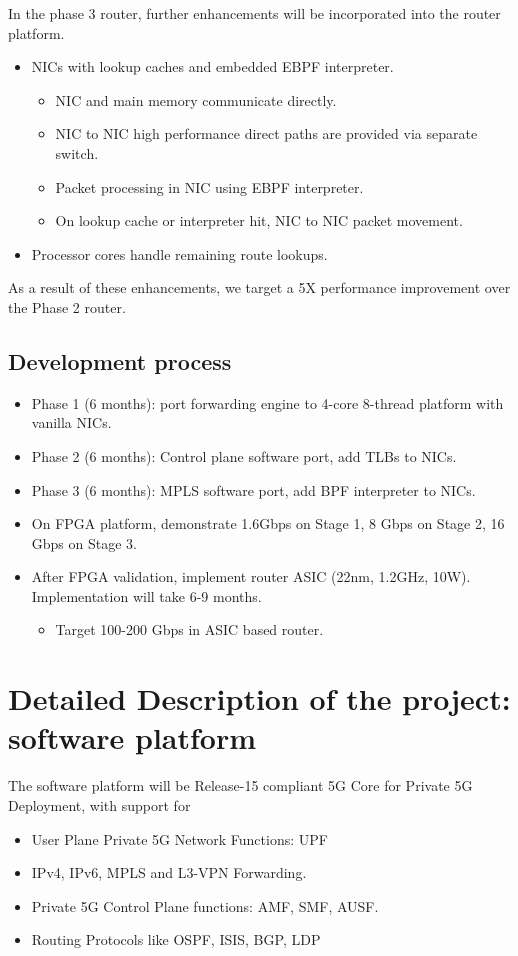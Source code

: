 \documentclass{article}
\begin{document}
In the phase 3 router, further enhancements will be
incorporated into the router platform.
\begin{itemize}
\item NICs with lookup caches and embedded EBPF interpreter.
\begin{itemize}
\item NIC and main memory communicate directly.
\item NIC to NIC high performance direct paths are provided via
separate switch.
\item Packet processing in NIC using EBPF interpreter.
\item On lookup cache or interpreter hit, NIC to NIC packet
movement.
\end{itemize}
\item Processor cores handle remaining route lookups.
\end{itemize}
As a result of these enhancements, we target a 5X performance
improvement over the Phase 2 router.

\subsection{Development process}

\begin{itemize}
\item Phase 1 (6 months):  port forwarding engine to 4-core 8-thread platform with vanilla NICs.
\item Phase 2 (6 months):  Control plane software port, add TLBs to NICs.
\item Phase 3 (6 months):  MPLS software port, add BPF interpreter to NICs.
\item On FPGA platform, demonstrate 1.6Gbps on Stage 1, 8 Gbps on Stage 2, 16 Gbps on Stage 3.
\item After FPGA validation, implement router ASIC (22nm, 1.2GHz, 10W).  Implementation will take 6-9 months.
\begin{itemize}
\item Target 100-200 Gbps in ASIC based router.
\end{itemize}
\end{itemize}

\section{Detailed Description of the project: software platform}

The software platform will be Release-15 compliant 5G Core for 
Private 5G Deployment, with support for
\begin{itemize}
\item User Plane Private 5G Network Functions: UPF  
\item IPv4, IPv6, MPLS and L3-VPN Forwarding.
\item Private 5G Control Plane functions: AMF, SMF, AUSF.
\item Routing Protocols like OSPF, ISIS, BGP, LDP
\end{itemize}
\end{document}
